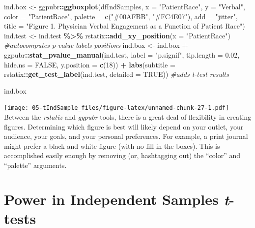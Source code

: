 \documentclass[
  11pt,
]{book}
\newenvironment{Shaded}{\begin{snugshade}}{\end{snugshade}}
\newcommand{\AttributeTok}[1]{\textcolor[rgb]{0.27,0.27,0.27}{#1}}
\newcommand{\CommentTok}[1]{\textcolor[rgb]{0.37,0.37,0.37}{\textit{#1}}}
\newcommand{\ConstantTok}[1]{\textcolor[rgb]{0.37,0.37,0.37}{#1}}
\newcommand{\DecValTok}[1]{\textcolor[rgb]{0.06,0.06,0.06}{#1}}
\newcommand{\FloatTok}[1]{\textcolor[rgb]{0.06,0.06,0.06}{#1}}
\newcommand{\FunctionTok}[1]{\textcolor[rgb]{0.27,0.27,0.27}{\textbf{#1}}}
\newcommand{\NormalTok}[1]{#1}
\newcommand{\OtherTok}[1]{\textcolor[rgb]{0.37,0.37,0.37}{#1}}
\newcommand{\SpecialCharTok}[1]{\textcolor[rgb]{0.43,0.43,0.43}{\textbf{#1}}}
\newcommand{\StringTok}[1]{\textcolor[rgb]{0.5,0.5,0.5}{#1}}
\begin{document}
\begin{Shaded}
\begin{Highlighting}[]
\NormalTok{ind.box }\OtherTok{\textless{}{-}}\NormalTok{ ggpubr}\SpecialCharTok{::}\FunctionTok{ggboxplot}\NormalTok{(dfIndSamples, }\AttributeTok{x =} \StringTok{"PatientRace"}\NormalTok{, }\AttributeTok{y =} \StringTok{"Verbal"}\NormalTok{,}
    \AttributeTok{color =} \StringTok{"PatientRace"}\NormalTok{, }\AttributeTok{palette =} \FunctionTok{c}\NormalTok{(}\StringTok{"\#00AFBB"}\NormalTok{, }\StringTok{"\#FC4E07"}\NormalTok{), }\AttributeTok{add =} \StringTok{"jitter"}\NormalTok{,}
    \AttributeTok{title =} \StringTok{"Figure 1. Physician Verbal Engagement as a Function of Patient Race"}\NormalTok{)}
\NormalTok{ind.test }\OtherTok{\textless{}{-}}\NormalTok{ ind.test }\SpecialCharTok{\%\textgreater{}\%}
\NormalTok{    rstatix}\SpecialCharTok{::}\FunctionTok{add\_xy\_position}\NormalTok{(}\AttributeTok{x =} \StringTok{"PatientRace"}\NormalTok{)  }\CommentTok{\#autocomputes p{-}value labels positions}
\NormalTok{ind.box }\OtherTok{\textless{}{-}}\NormalTok{ ind.box }\SpecialCharTok{+}\NormalTok{ ggpubr}\SpecialCharTok{::}\FunctionTok{stat\_pvalue\_manual}\NormalTok{(ind.test, }\AttributeTok{label =} \StringTok{"p.signif"}\NormalTok{,}
    \AttributeTok{tip.length =} \FloatTok{0.02}\NormalTok{, }\AttributeTok{hide.ns =} \ConstantTok{FALSE}\NormalTok{, }\AttributeTok{y.position =} \FunctionTok{c}\NormalTok{(}\DecValTok{18}\NormalTok{)) }\SpecialCharTok{+} \FunctionTok{labs}\NormalTok{(}\AttributeTok{subtitle =}\NormalTok{ rstatix}\SpecialCharTok{::}\FunctionTok{get\_test\_label}\NormalTok{(ind.test,}
    \AttributeTok{detailed =} \ConstantTok{TRUE}\NormalTok{))  }\CommentTok{\#adds t{-}test results}

\NormalTok{ind.box}
\end{Highlighting}
\end{Shaded}

\texttt{[image: 05-tIndSample\_files/figure-latex/unnamed-chunk-27-1.pdf]} Between the \emph{rstatix} and \emph{ggpubr} tools, there is a great deal of flexibility in creating figures. Determining which figure is best will likely depend on your outlet, your audience, your goals, and your personal preferences. For example, a print journal might prefer a black-and-white figure (with no fill in the boxes). This is accomplished easily enough by removing (or, hashtagging out) the ``color'' and ``palette'' arguments.

\hypertarget{power-in-independent-samples-t-tests}{%
\section{\texorpdfstring{Power in Independent Samples \emph{t}-tests}{Power in Independent Samples t-tests}}\label{power-in-independent-samples-t-tests}}
\end{document}
